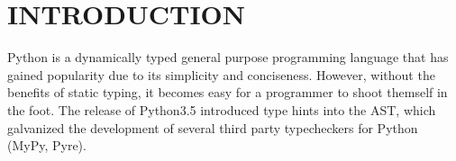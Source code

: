 \section{INTRODUCTION}
    Python is a dynamically typed general purpose programming language 
    that has gained popularity due to its simplicity and conciseness.
    However, without the benefits of static typing, it becomes easy for
    a programmer to shoot themself in the foot. The release of Python3.5
    introduced type hints into the AST, which galvanized the development 
    of several third party typecheckers for Python (MyPy, Pyre).
